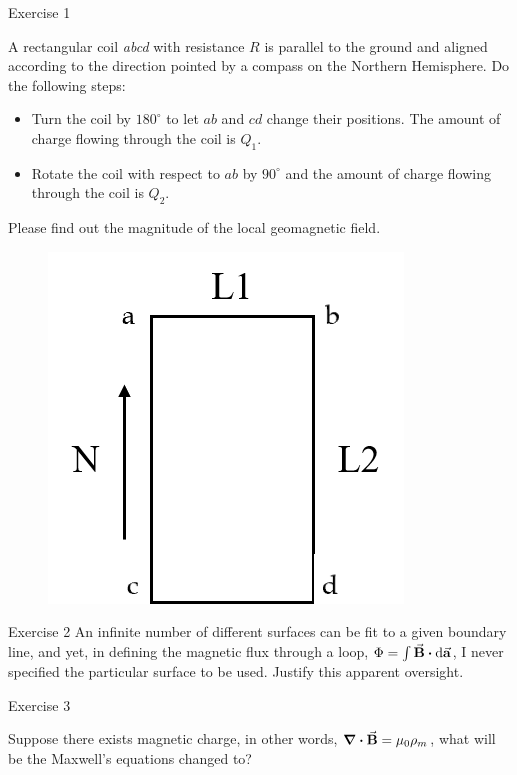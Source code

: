 \documentclass{beamer}
\begin{document}
\begin{frame}{Exercise 1}

A rectangular coil \textit{abcd} with resistance $R$ is parallel to the ground and aligned according to the direction pointed by a compass on the Northern Hemisphere. Do the following steps:
\begin{itemize}
    \item Turn the coil by $180^{\circ}$ to let $a b$ and $c d$ change their positions. The amount of charge flowing through the coil is $Q_{1}$. 
    \item Rotate the coil with respect to $a b$ by $90^{\circ}$ and the amount of charge flowing through the coil is $Q_{2}$. 
\end{itemize}
Please find out the magnitude of the local geomagnetic field.    

\begin{figure}[htbp]

    \includegraphics[scale=0.3]{images/ex1.png}
\end{figure}

\end{frame}


\begin{frame}{Exercise 2}
    An infinite number of different surfaces can be fit to a given boundary line, and yet, in defining the magnetic flux through a loop, $\Phi = \int \va{B}\vdot \dd{\va{a}}$, I never specified the particular surface to be used. Justify this apparent oversight.
\end{frame}

\begin{frame}{Exercise 3}

    Suppose there exists magnetic charge, in other words, $\div \va B = \mu_0 \rho_m$, what will be the Maxwell's equations changed to?
    
\end{frame}
\end{document}
